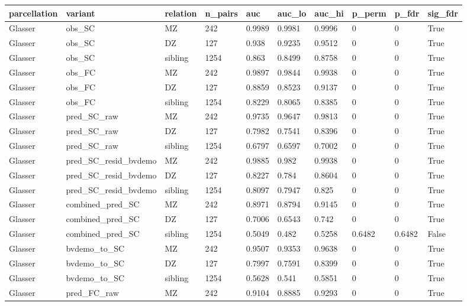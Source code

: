{\def\LTcaptype{none} %
\begin{longtable}[]{@{}llllllllll@{}}
\toprule\noalign{}
parcellation & variant & relation & n\_pairs & auc & auc\_lo & auc\_hi & p\_perm & p\_fdr & sig\_fdr \\
\midrule\noalign{}
\endhead
\bottomrule\noalign{}
\endlastfoot
Glasser & obs\_SC & MZ & 242 & 0.9989 & 0.9981 & 0.9996 & 0 & 0 & True \\
Glasser & obs\_SC & DZ & 127 & 0.938 & 0.9235 & 0.9512 & 0 & 0 & True \\
Glasser & obs\_SC & sibling & 1254 & 0.863 & 0.8499 & 0.8758 & 0 & 0 & True \\
Glasser & obs\_FC & MZ & 242 & 0.9897 & 0.9844 & 0.9938 & 0 & 0 & True \\
Glasser & obs\_FC & DZ & 127 & 0.8859 & 0.8523 & 0.9137 & 0 & 0 & True \\
Glasser & obs\_FC & sibling & 1254 & 0.8229 & 0.8065 & 0.8385 & 0 & 0 & True \\
Glasser & pred\_SC\_raw & MZ & 242 & 0.9735 & 0.9647 & 0.9813 & 0 & 0 & True \\
Glasser & pred\_SC\_raw & DZ & 127 & 0.7982 & 0.7541 & 0.8396 & 0 & 0 & True \\
Glasser & pred\_SC\_raw & sibling & 1254 & 0.6797 & 0.6597 & 0.7002 & 0 & 0 & True \\
Glasser & pred\_SC\_resid\_bvdemo & MZ & 242 & 0.9885 & 0.982 & 0.9938 & 0 & 0 & True \\
Glasser & pred\_SC\_resid\_bvdemo & DZ & 127 & 0.8227 & 0.784 & 0.8604 & 0 & 0 & True \\
Glasser & pred\_SC\_resid\_bvdemo & sibling & 1254 & 0.8097 & 0.7947 & 0.825 & 0 & 0 & True \\
Glasser & combined\_pred\_SC & MZ & 242 & 0.8971 & 0.8794 & 0.9145 & 0 & 0 & True \\
Glasser & combined\_pred\_SC & DZ & 127 & 0.7006 & 0.6543 & 0.742 & 0 & 0 & True \\
Glasser & combined\_pred\_SC & sibling & 1254 & 0.5049 & 0.482 & 0.5258 & 0.6482 & 0.6482 & False \\
Glasser & bvdemo\_to\_SC & MZ & 242 & 0.9507 & 0.9353 & 0.9638 & 0 & 0 & True \\
Glasser & bvdemo\_to\_SC & DZ & 127 & 0.7997 & 0.7591 & 0.8399 & 0 & 0 & True \\
Glasser & bvdemo\_to\_SC & sibling & 1254 & 0.5628 & 0.541 & 0.5851 & 0 & 0 & True \\
Glasser & pred\_FC\_raw & MZ & 242 & 0.9104 & 0.8885 & 0.9293 & 0 & 0 & True \\

\end{longtable}}
